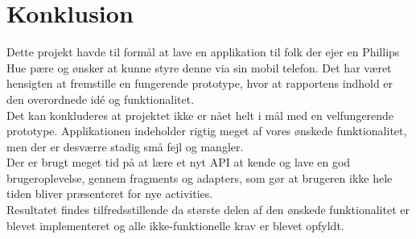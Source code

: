 \chapter{Konklusion}
Dette projekt havde til formål at lave en applikation til folk der ejer en Phillips Hue pære og ønsker at kunne styre denne via sin mobil telefon. Det har været hensigten at fremstille en fungerende prototype, hvor at rapportens indhold er den overordnede idé og funktionalitet.\\
Det kan konkluderes at projektet ikke er nået helt i mål med en velfungerende prototype. Applikationen indeholder rigtig meget af vores ønskede funktionalitet, men der er desværre stadig små fejl og mangler.\\
Der er brugt meget tid på at lære et nyt API at kende og lave en god brugeroplevelse, gennem fragments og adapters, som gør at brugeren ikke hele tiden bliver præsenteret for nye activities.\\
Resultatet findes tilfredsstillende da største delen af den ønskede funktionalitet er blevet implementeret og alle ikke-funktionelle krav er blevet opfyldt. 
